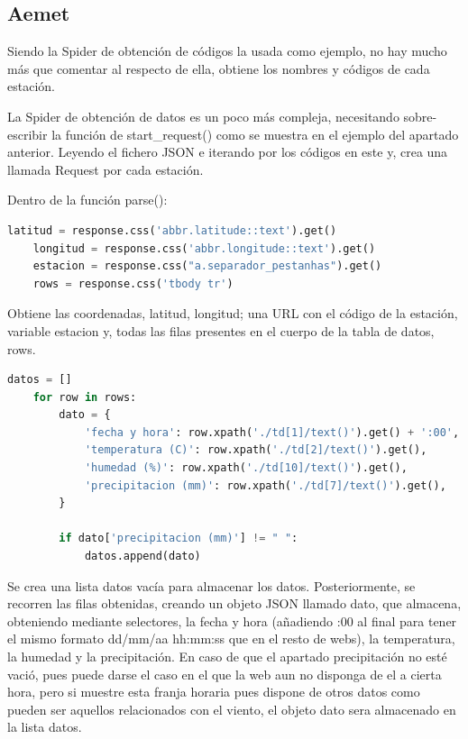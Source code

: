 \subsection{Aemet}
Siendo la Spider de obtención de códigos la usada como ejemplo, no hay mucho más que comentar al respecto de ella, obtiene los nombres y códigos de cada estación.

La Spider de obtención de datos es un poco más compleja, necesitando sobre-escribir la función de start\_request() como se muestra en el ejemplo del apartado anterior. Leyendo el fichero JSON e iterando por los códigos en este y, crea una llamada Request por cada estación.

Dentro de la función parse():

\begin{lstlisting}[language=Python, caption={Selector en parse() de Aemet Data Spider}]
	latitud = response.css('abbr.latitude::text').get()
	longitud = response.css('abbr.longitude::text').get()
	estacion = response.css("a.separador_pestanhas").get()
	rows = response.css('tbody tr')
\end{lstlisting}

Obtiene las coordenadas, latitud, longitud; una URL con el código de la estación, variable estacion y, todas las filas presentes en el cuerpo de la tabla de datos, rows.

\begin{lstlisting}[language=Python, caption={Trabajar sobre los datos de Aemet Data Spider}]
	datos = []
	for row in rows:
		dato = {
			'fecha y hora': row.xpath('./td[1]/text()').get() + ':00',
			'temperatura (C)': row.xpath('./td[2]/text()').get(),
			'humedad (%)': row.xpath('./td[10]/text()').get(),
			'precipitacion (mm)': row.xpath('./td[7]/text()').get(),
		}
		
		if dato['precipitacion (mm)'] != " ":
			datos.append(dato)
\end{lstlisting}

Se crea una lista datos vacía para almacenar los datos. Posteriormente, se recorren las filas obtenidas, creando un objeto JSON llamado dato, que almacena, obteniendo mediante selectores, la fecha y hora (añadiendo :00 al final para tener el mismo formato dd/mm/aa hh:mm:ss que en el resto de webs), la temperatura, la humedad y la precipitación.\newline
\newline
En caso de que el apartado precipitación no esté vació, pues puede darse el caso en el que la web aun no disponga de el a cierta hora, pero si muestre esta franja horaria pues dispone de otros datos como pueden ser aquellos relacionados con el viento, el objeto dato sera almacenado en la lista datos.

